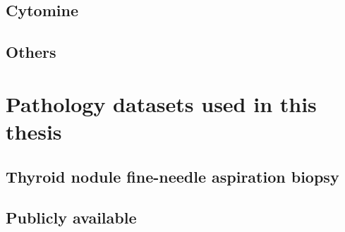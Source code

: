 \subsection{Cytomine}

\subsection{Others}

\section{Pathology datasets used in this thesis}
\label{sec:backdp:dataset}




\subsection{Thyroid nodule fine-needle aspiration biopsy}



\subsection{Publicly available}
